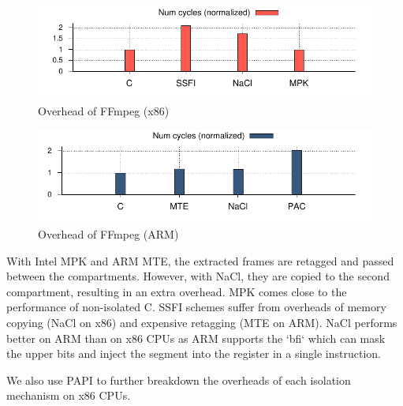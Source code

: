 \begin{figure}[!htbp]
	\includegraphics[width=1.0\columnwidth]{figures/ffmpeg-x86.pdf}
\caption{Overhead of FFmpeg (x86)}
	\label{fig:ffmpeg-x86}
\end{figure}

\begin{figure}[!htbp]
	\includegraphics[width=1.0\columnwidth]{figures/ffmpeg-arm.pdf}
\caption{Overhead of FFmpeg (ARM)}
	\label{fig:ffmpeg-arm}
\end{figure}

With Intel MPK and ARM MTE, the extracted frames are retagged and passed between the compartments. However, with NaCl, they are copied to the second compartment, resulting in an extra overhead. MPK comes close to the performance of non-isolated C. SSFI schemes suffer from overheads of memory copying (NaCl on x86) and expensive retagging (MTE on ARM). NaCl performs better on ARM than on x86 CPUs as ARM supports the `bfi` which can mask the upper bits and inject the segment into the register in a single instruction.

We also use PAPI to further breakdown the overheads of each isolation mechanism on x86 CPUs. 


